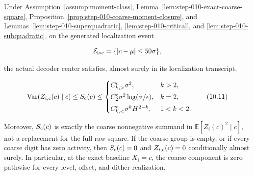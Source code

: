 \begin{proposition}\label{prop:step-010-three-regime}
Under Assumption~\ref{assump:moment-class},
Lemma~\ref{lem:step-010-exact-coarse-square},
Proposition~\ref{prop:step-010-coarse-moment-closure}, and
Lemmas~\ref{lem:step-010-superquadratic},
\ref{lem:step-010-critical}, and
\ref{lem:step-010-subquadratic}, on
the generated localization event

\[
\mathcal E_{\rm loc}=\{|c-\mu|\leq50\sigma\},
\]

the actual decoder center satisfies, almost surely in its localization
transcript,

\[
\operatorname{Var}(Z_{i,{\rm c}}(c)\mid c)
\leq S_{\rm c}(c)
\leq
\begin{cases}
C_{k,>}^{\rm c}\sigma^2, & k>2,\\[0.3em]
C_2^{\rm c}\sigma^2\log(\sigma/\epsilon), & k=2,\\[0.3em]
C_{k,<}^{\rm c}\sigma^kH^{2-k}, & 1<k<2.
\end{cases}
\tag{10.11}
\]

Moreover, \(S_{\rm c}(c)\) is exactly the coarse nonnegative summand in
\(\mathbb E[Z_i(c)^2\mid c]\), not a replacement for the full raw square.
If the coarse group is empty, or if every coarse digit has zero activity,
then \(S_{\rm c}(c)=0\) and
\(Z_{i,{\rm c}}(c)=0\) conditionally almost surely. In particular, at the
exact baseline \(X_i=c\), the coarse component is zero pathwise for every
level, offset, and dither realization.
\end{proposition}

